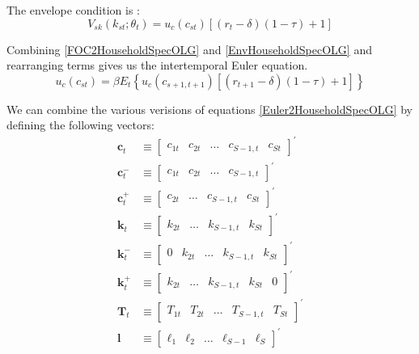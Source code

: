 \documentclass[letterpaper,12pt]{article}
\theoremstyle{definition}
\begin{document}
\begin{spacing}{1.5}
	The envelope condition is :
	\begin{equation}\label{EnvHouseholdSpecOLG}
		V_{sk}(k_{st};\theta_t) = u_c(c_{st})[(r_t-\delta)(1-\tau)+1]
	\end{equation}

	Combining \eqref{FOC2HouseholdSpecOLG} and \eqref{EnvHouseholdSpecOLG} and rearranging terms gives us the intertemporal Euler equation.
	\begin{equation}\label{Euler2HouseholdSpecOLG}
		u_c(c_{st}) = \beta E_t\left\{ u_c(c_{s+1,t+1})[(r_{t+1}-\delta)(1-\tau)+1] \right\}
	\end{equation}

	We can combine the various verisions of equations \eqref{Euler2HouseholdSpecOLG} by defining the following vectors:
	\begin{align}
		\mathbf{c}_t & \equiv \begin{bmatrix} c_{1t} & c_{2t} & \dots & c_{S-1,t} & c_{St} \end{bmatrix}^{'} \\
		\mathbf{c}^-_t & \equiv \begin{bmatrix} c_{1t} & c_{2t} & \dots & c_{S-1,t} \end{bmatrix}^{'} \\
		\mathbf{c}^+_t & \equiv \begin{bmatrix} c_{2t} & \dots & c_{S-1,t} & c_{St} \end{bmatrix}^{'} \\
		\mathbf{k}_t & \equiv \begin{bmatrix} k_{2t} & \dots & k_{S-1,t} & k_{St} \end{bmatrix}^{'} \\
		\mathbf{k}^-_t & \equiv \begin{bmatrix} 0 & k_{2t} & \dots & k_{S-1,t} & k_{St} \end{bmatrix}^{'} \\
		\mathbf{k}^+_t & \equiv \begin{bmatrix} k_{2t} & \dots & k_{S-1,t} & k_{St} & 0 \end{bmatrix}^{'} \\
		\mathbf{T}_t & \equiv \begin{bmatrix} T_{1t} & T_{2t} & \dots & T_{S-1,t} & T_{St} \end{bmatrix}^{'} \\
		\mathbf{l} & \equiv \begin{bmatrix} \ell_{1} & \ell_{2} & \dots & \ell_{S-1} & \ell_{S} \end{bmatrix}^{'}
	\end{align}


\end{spacing}
\end{document}
